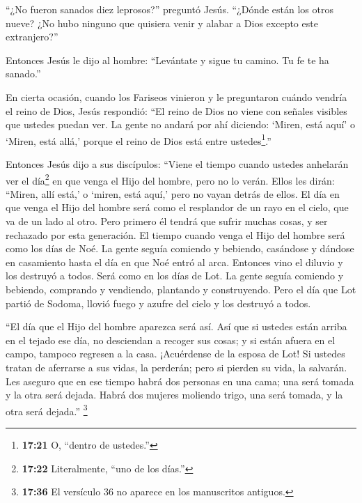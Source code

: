  ``¿No fueron sanados diez leprosos?'' preguntó Jesús.
``¿Dónde están los otros nueve?  ¿No hubo ninguno que
quisiera venir y alabar a Dios excepto este extranjero?''

 Entonces Jesús le dijo al hombre: ``Levántate y sigue tu
camino. Tu fe te ha sanado.''

 En cierta ocasión, cuando los Fariseos vinieron y le
preguntaron cuándo vendría el reino de Dios, Jesús respondió: ``El reino
de Dios no viene con señales visibles que ustedes puedan ver.
 La gente no andará por ahí diciendo: `Miren, está aquí' o
`Miren, está allá,' porque el reino de Dios está entre
ustedes\footnote{\textbf{17:21} O, ``dentro de ustedes.''}.''

 Entonces Jesús dijo a sus discípulos: ``Viene el tiempo
cuando ustedes anhelarán ver el día\footnote{\textbf{17:22}
  Literalmente, ``uno de los días.''} en que venga el Hijo del hombre,
pero no lo verán.  Ellos les dirán: ``Miren, allí está,' o
`miren, está aquí,' pero no vayan detrás de ellos.  El día
en que venga el Hijo del hombre será como el resplandor de un rayo en el
cielo, que va de un lado al otro.  Pero primero él tendrá
que sufrir muchas cosas, y ser rechazado por esta generación.
 El tiempo cuando venga el Hijo del hombre será como los
días de Noé.  La gente seguía comiendo y bebiendo,
casándose y dándose en casamiento hasta el día en que Noé entró al arca.
Entonces vino el diluvio y los destruyó a todos.  Será como
en los días de Lot. La gente seguía comiendo y bebiendo, comprando y
vendiendo, plantando y construyendo.  Pero el día que Lot
partió de Sodoma, llovió fuego y azufre del cielo y los destruyó a
todos.

 ``El día que el Hijo del hombre aparezca será así.
 Así que si ustedes están arriba en el tejado ese día, no
desciendan a recoger sus cosas; y si están afuera en el campo, tampoco
regresen a la casa.  ¡Acuérdense de la esposa de Lot!
 Si ustedes tratan de aferrarse a sus vidas, la perderán;
pero si pierden su vida, la salvarán.  Les aseguro que en
ese tiempo habrá dos personas en una cama; una será tomada y la otra
será dejada.  Habrá dos mujeres moliendo trigo, una será
tomada, y la otra será dejada.''  \footnote{\textbf{17:36}
  El versículo 36 no aparece en los manuscritos antiguos.}

